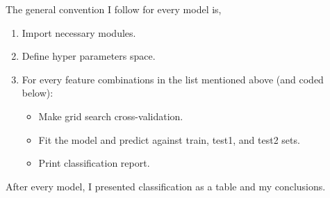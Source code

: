 \documentclass[11pt]{article}
\begin{document}
The general convention I follow for every model is,
\begin{enumerate}
    \item Import necessary modules.
    \item Define hyper parameters space.
    \item For every feature combinations in the list mentioned above (and coded below):
    \begin{itemize}
        \item Make grid search cross-validation.
        \item Fit the model and predict against train, test1, and test2 sets. 
        \item Print classification report.
    \end{itemize}
\end{enumerate}

After every model, I presented classification as a table and my
conclusions.
\end{document}
